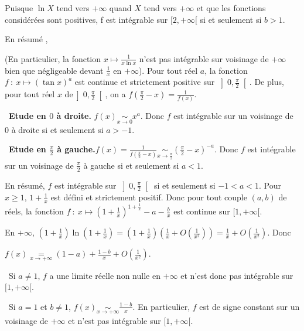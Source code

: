 {{Puisque $\ln X$ tend vers $+\infty$ quand $X$ tend vers $+\infty$ et que les fonctions considérées sont positives, f est intégrable sur $[2, +\infty[$ si et seulement si $b > 1$.

En résumé , 

\begin{center}
\shadowbox{
la fonction $x\mapsto\frac{1}{x^a\ln^bx}$ est intégrable sur $[2,+\infty[$ si et seulement si $a > 1$ ou ($a=1$ et $b > 1$).
}
\end{center}

(En particulier, la fonction $x\mapsto\frac{1}{x\ln x}$ n'est pas intégrable sur voisinage de $+\infty$ bien que négligeable devant $\frac{1}{x}$ en $+\infty$).
Pour tout réel $a$,  la fonction $f~:~x\mapsto(\tan x)^a$ est continue et strictement positive sur $\left]0,\frac{\pi}{2}\right[$. De plus, pour tout réel $x$ de$\left]0,\frac{\pi}{2}\right[$, on a $f\left(\frac{\pi}{2}-x\right) =\frac{1}{f(x)}$.

\textbullet~\textbf{Etude en $0$ à droite.} $f(x)\underset{x\rightarrow0}{\sim}x^a$. Donc $f$ est intégrable sur un voisinage de $0$ à droite si et seulement si $a > -1$.

\textbullet~\textbf{Etude en $\frac{\pi}{2}$ à gauche.}$f(x)=\frac{1}{f\left(\frac{\pi}{2}-x\right)}\underset{x\rightarrow\frac{\pi}{2}}{\sim}\left(\frac{\pi}{2}-x\right)^{-a}$. Donc $f$ est intégrable sur un voisinage de $\frac{\pi}{2}$ à gauche si et seulement si $a < 1$. 

En résumé, $f$ est intégrable sur $\left]0,\frac{\pi}{2}\right[$ si et seulement si $-1 < a < 1$.
Pour $x\geqslant1$, $1+\frac{1}{x}$ est défini et strictement positif. Donc pour tout couple $(a,b)$ de réels, la fonction $f~:~ x\mapsto\left(1+\frac{1}{x}\right)^{1+\frac{1}{x}}-a -\frac{b}{x}$  est continue sur $[1,+\infty[$.

En $+\infty$, $\left(1+\frac{1}{x}\right)\ln\left(1+\frac{1}{x}\right) =\left(1+\frac{1}{x}\right)\left(\frac{1}{x}+O\left(\frac{1}{x^2}\right)\right)=\frac{1}{x}+O\left(\frac{1}{x^2}\right)$. Donc 

\begin{center}
$f(x)\underset{x\rightarrow+\infty}{=}(1-a)+\frac{1-b}{x}+O\left(\frac{1}{x^2}\right)$.
\end{center}

\textbullet~Si $a\neq 1$, $f$ a une limite réelle non nulle en $+\infty$ et n'est donc pas intégrable sur $[1,+\infty[$.

\textbullet~Si $a = 1$ et $b\neq 1$, $f(x)\underset{x\rightarrow+\infty}{\sim}\frac{1-b}{x}$. En particulier, $f$ est de signe constant sur un voisinage de $+\infty$ et n'est pas intégrable sur $[1,+\infty[$.

}}

